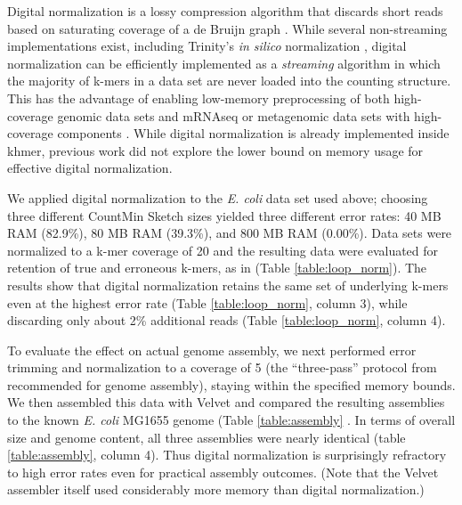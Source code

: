 \documentclass{article}
\begin{document}
Digital normalization is a lossy compression algorithm that discards
short reads based on saturating coverage of a de Bruijn graph
\cite{Brown2012}.  While several non-streaming implementations exist, including
Trinity's {\em in silico} normalization \cite{Haas2013,Brown2012blog}, digital normalization can be efficiently implemented as a {\em
  streaming} algorithm in which the majority of k-mers in a data set
are never loaded into the counting structure.  This has the advantage of enabling low-memory
preprocessing of both high-coverage genomic data sets and mRNAseq or
metagenomic data sets with high-coverage components \cite{Brown2012,
  Howe2012}.  While digital normalization is already
implemented inside khmer, previous work did not explore the lower bound
on memory usage for effective digital normalization.

We applied digital normalization to the {\em E. coli} data set used
above; choosing three different CountMin Sketch sizes yielded three different
error rates: 40 MB RAM (82.9\%), 80 MB RAM (39.3\%), and 800 MB RAM
(0.00\%).  Data sets were normalized to a k-mer coverage of 20 and the
resulting data were evaluated for retention of true and erroneous
k-mers, as in \cite{Brown2012} (Table \ref{table:loop_norm}).  The results show that
digital normalization retains the same set of underlying
k-mers even at the highest error rate (Table \ref{table:loop_norm}, column 3), while discarding only
about 2\% additional reads (Table \ref{table:loop_norm}, column 4).

To evaluate the effect on actual genome assembly, we next performed
error trimming and normalization to a coverage of 5 (the
``three-pass'' protocol from \cite{Brown2012} recommended for
genome assembly), staying within the specified memory bounds.  We then
assembled this data with Velvet and compared the resulting assemblies to the known
{\em E. coli} MG1655 genome (Table \ref{table:assembly} \cite{Zerbino2008}.  In terms of overall size
and genome content, all three assemblies were nearly identical (table
\ref{table:assembly}, column 4).  Thus digital normalization is surprisingly refractory to high
error rates even for practical assembly outcomes.  (Note that
the Velvet assembler itself used considerably more memory than digital
normalization.)
\end{document}
